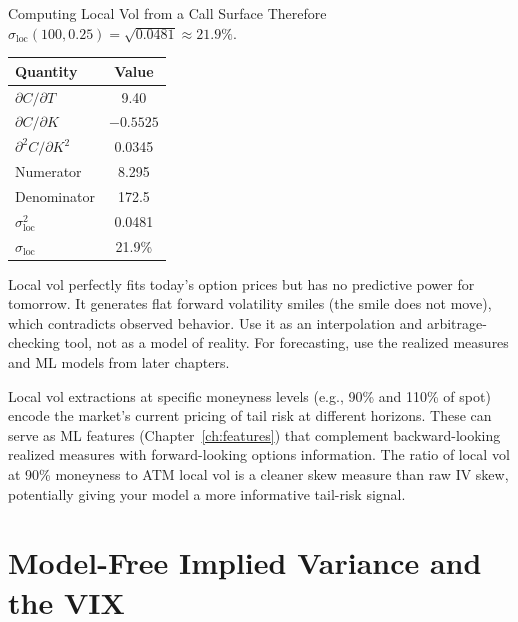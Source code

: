 \begin{workedexample}{Computing Local Vol from a Call Surface}
Therefore $\sigma_{\text{loc}}(100, 0.25) = \sqrt{0.0481} \approx 21.9\%$.

\begin{center}
\begin{tabular}{@{}lc@{}}
\toprule
Quantity & Value \\
\midrule
$\partial C / \partial T$       & 9.40 \\
$\partial C / \partial K$       & $-0.5525$ \\
$\partial^2 C / \partial K^2$   & 0.0345 \\
Numerator                        & 8.295 \\
Denominator                      & 172.5 \\
$\sigma_{\text{loc}}^2$         & 0.0481 \\
$\sigma_{\text{loc}}$           & 21.9\% \\
\bottomrule
\end{tabular}
\end{center}
\end{workedexample}

\begin{warning}
Local vol perfectly fits today's option prices but has no predictive power for tomorrow.
It generates flat forward volatility smiles (the smile does not move), which contradicts observed behavior.
Use it as an interpolation and arbitrage-checking tool, not as a model of reality.
For forecasting, use the realized measures and ML models from later chapters.
\end{warning}

\begin{projectconnection}
Local vol extractions at specific moneyness levels (e.g., 90\% and 110\% of spot) encode the market's current pricing of tail risk at different horizons.
These can serve as ML features (Chapter~\ref{ch:features}) that complement backward-looking realized measures with forward-looking options information.
The ratio of local vol at 90\% moneyness to ATM local vol is a cleaner skew measure than raw IV skew, potentially giving your model a more informative tail-risk signal.
\end{projectconnection}


\section{Model-Free Implied Variance and the VIX}
\label{sec:vix}

